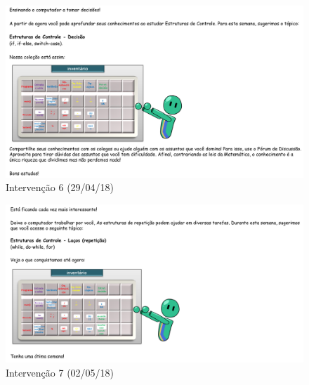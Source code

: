 \begin{figure}[htb]
  \caption{\label{fig:intervencao-6}Intervenção 6 (29/04/18)}
  \begin{center}
      \includegraphics[scale=0.6]{./Figuras/intervencao-6.png}
  \end{center}
\end{figure}

\begin{figure}[htb]
  \caption{\label{fig:intervencao-7}Intervenção 7 (02/05/18)}
  \begin{center}
      \includegraphics[scale=0.6]{./Figuras/intervencao-7.png}
  \end{center}
\end{figure}

